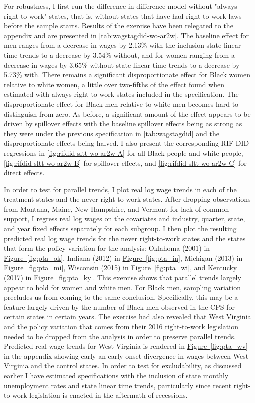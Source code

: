 \documentclass[11pt]{article}
\begin{document}
For robustness, I first run the difference in difference model without "always right-to-work" states, that is, without states that have had right-to-work laws before the sample starts. Results of the exercise have been relegated to the appendix and are presented in \autoref{tab:wagstagdid-wo-ar2w}. The baseline effect for men ranges from a decrease in wages by 2.13\% with the inclusion state linear time trends to a decrease by 3.54\% without, and for women ranging from a decrease in wages by 3.65\% without state linear time trends to a decrease by 5.73\% with. There remains a significant disproportionate effect for Black women relative to white women, a little over two-fifths of the effect found when estimated with always right-to-work states included in the specification. The disproportionate effect for Black men relative to white men becomes hard to distinguish from zero. As before, a significant amount of the effect appears to be driven by spillover effects with the baseline spillover effects being as strong as they were under the previous specification in \autoref{tab:wagstagdid} and the disproportionate effects being halved. I also present the corresponding RIF-DID regressions in \autoref{fig:rifdid-sltt-wo-ar2w-A} for all Black people and white people, \autoref{fig:rifdid-sltt-wo-ar2w-B} for spillover effects, and \autoref{fig:rifdid-sltt-wo-ar2w-C} for direct effects.

In order to test for parallel trends, I plot real log wage trends in each of the treatment states and the never right-to-work states. After dropping observations from Montana, Maine, New Hampshire, and Vermont for lack of common support, I regress real log wages on the covariates and industry, quarter, state, and year fixed effects separately for each subgroup. I then plot the resulting predicted real log wage trends for the never right-to-work states and the states that form the policy variation for the analysis: Oklahoma (2001) in \hyperref[fig:pta_ok]{Figure~\ref*{fig:pta_ok}}, Indiana (2012) in \hyperref[fig:pta_in]{Figure~\ref*{fig:pta_in}}, Michigan (2013) in \hyperref[fig:pta_mi]{Figure~\ref*{fig:pta_mi}}, Wisconsin (2015) in \hyperref[fig:pta_wi]{Figure~\ref*{fig:pta_wi}}, and Kentucky (2017) in \hyperref[fig:pta_ky]{Figure~\ref*{fig:pta_ky}}. This exercise shows that parallel trends largely appear to hold for women and white men. For Black men, sampling variation precludes us from coming to the same conclusion. Specifically, this may be a feature largely driven by the number of Black men observed in the CPS for certain states in certain years. The exercise had also revealed that West Virginia and the policy variation that comes from their 2016 right-to-work legislation needed to be dropped from the analysis in order to preserve parallel trends. Predicted real wage trends for West Virginia is rendered in \hyperref[fig:pta_wv]{Figure~\ref*{fig:pta_wv}} in the appendix showing early an early onset divergence in wages between West Virginia and the control states. In order to test for excludability, as discussed earlier I have estimated specifications with the inclusion of state monthly unemployment rates and state linear time trends, particularly since recent right-to-work legislation is enacted in the aftermath of recessions.
\end{document}

